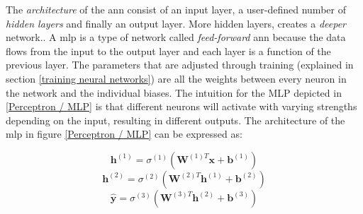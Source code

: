         The \textit{architecture} of the \gls{ann} consist of an input layer, a user-defined number of \textit{hidden layers} and finally an output layer\cite{razavi2021deep_exp_per}. More hidden layers, creates a \textit{deeper} network.. A \gls{mlp} is a type of network called \textit{feed-forward} \gls{ann} because the data flows from the input to the output layer and each layer is a function of the previous layer. The parameters that are adjusted through training (explained in section \ref{training neural networks}) are all the weights between every neuron in the network and the individual biases. The intuition for the MLP depicted in \ref{Perceptron / MLP} is that different neurons will activate with varying strengths depending on the input, resulting in different outputs. The architecture of the \gls{mlp} in figure \ref{Perceptron / MLP} can be expressed as\cite{Goodfellow-et-al-2016_architecture}:
        
        \begin{equation}
            \textbf{h}^{(1)} = \sigma^{(1)}(\textbf{W}^{(1)T}\textbf{x} + \textbf{b}^{(1)})
        \end{equation}
        \begin{equation}
            \textbf{h}^{(2)} = \sigma^{(2)}(\textbf{W}^{(2)T}\textbf{h}^{(1)} + \textbf{b}^{(2)})
        \end{equation}
        \begin{equation} \label{mlp outputlayer eq}
            \hat{\textbf{y}} = \sigma^{(3)}(\textbf{W}^{(3)T}\textbf{h}^{(2)} + \textbf{b}^{(3)})
        \end{equation}
        
        
